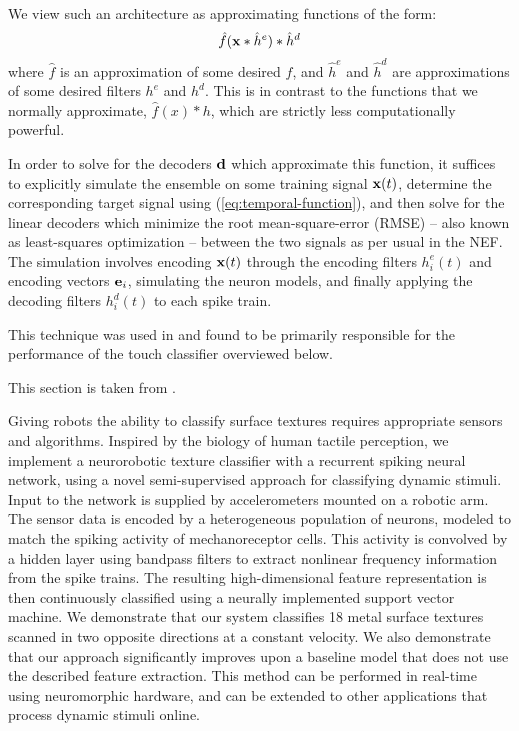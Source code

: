 We view such an architecture as approximating functions of the form:
\begin{equation} \label{eq:temporal-function}
\hat{f}(\mathbf{x} \ast \hat{h}^e) \ast \hat{h}^d
\end{equation}
where $\hat{f}$ is an approximation of some desired $f$, and $\hat{h}^e$ and $\hat{h}^d$ are approximations of some desired filters $h^e$ and $h^d$.
This is in contrast to the functions that we normally approximate, $\hat{f}(x) \ast h$, which are strictly less computationally powerful.

In order to solve for the decoders $\mathbf{d}$ which approximate this function, it suffices to explicitly simulate the ensemble on some training signal $\mathbf{x}(t)$, determine the corresponding target signal using (\ref{eq:temporal-function}), and then solve for the linear decoders which minimize the root mean-square-error (RMSE) -- also known as least-squares optimization -- between the two signals as per usual in the NEF.
The simulation involves encoding $\mathbf{x}(t)$ through the encoding filters $h_i^e(t)$ and encoding vectors $\mathbf{e}_i$, simulating the neuron models, and finally applying the decoding filters $h_i^d(t)$ to each spike train.

This technique was used in \citet{voelker2016a} and found to be primarily responsible for the performance of the touch classifier overviewed below.

This section is taken from \citep{voelker2016a}.

Giving robots the ability to classify surface textures requires appropriate sensors and algorithms. Inspired by the biology of human tactile perception, we implement a neurorobotic texture classifier with a recurrent spiking neural network, using a novel semi-supervised approach for classifying dynamic stimuli. Input to the network is supplied by accelerometers mounted on a robotic arm. The sensor data is encoded by a heterogeneous population of neurons, modeled to match the spiking activity of mechanoreceptor cells. This activity is convolved by a hidden layer using bandpass filters to extract nonlinear frequency information from the spike trains. The resulting high-dimensional feature representation is then continuously classified using a neurally implemented support vector machine. We demonstrate that our system classifies 18 metal surface textures scanned in two opposite directions at a constant velocity. %
We also demonstrate that our approach significantly improves upon a baseline model that does not use the described feature extraction. 
This method can be performed in real-time using neuromorphic hardware, and can be extended to other applications that process dynamic stimuli online. 

